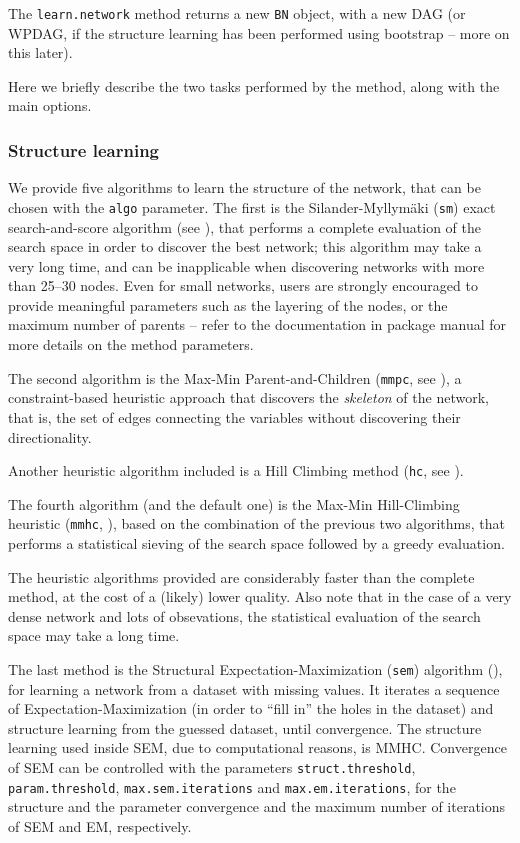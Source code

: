 \documentclass{article}\usepackage[]{graphicx}\usepackage[]{color}
\newcommand{\Robject}[1]{{\texttt{#1}}}
\newcommand{\Rmethod}[1]{{\texttt{#1}}}
\newcommand{\Rfunarg}[1]{{\texttt{#1}}}
\begin{document}
The \Rmethod{learn.network} method returns a new \Robject{BN} object, with a new DAG (or WPDAG, if the structure
learning has been performed using bootstrap -- more on this later).

Here we briefly describe the two tasks performed by the method, along with the main options.

\subsubsection{Structure learning}
We provide five algorithms to learn the structure of the network, that can be chosen with the \texttt{algo} parameter.
The first is the Silander-Myllym\"aki (\texttt{sm})
exact search-and-score algorithm (see \citet*{silander2012simple}), that performs a complete evaluation of the search space in order to discover
the best network; this algorithm may take a very long time, and can be inapplicable when discovering networks
with more than 25--30 nodes. Even for small networks, users are strongly encouraged to provide
meaningful parameters such as the layering of the nodes, or the maximum number of parents -- refer to the 
documentation in package manual for more details on the method parameters.

The second algorithm is the Max-Min Parent-and-Children (\texttt{mmpc}, see \citet*{tsamardinos2006max}), a
constraint-based heuristic approach that discovers the \emph{skeleton} of the network, that is, the set of edges
connecting the variables without discovering their directionality.

Another heuristic algorithm included is a Hill Climbing method (\texttt{hc}, see \citet*{tsamardinos2006max}).

The fourth algorithm (and the default one) is the Max-Min Hill-Climbing heuristic (\texttt{mmhc}, \citet*{tsamardinos2006max}),
based on the combination of the previous two algorithms, that performs a statistical
sieving of the search space followed by a greedy evaluation. 

The heuristic algorithms provided are considerably faster than the complete method, at the cost of a (likely)
lower quality. Also note that in the case of a very dense network and lots of obsevations, the statistical evaluation
of the search space may take a long time.%

The last method is the Structural Expectation-Maximization (\texttt{sem}) algorithm (\citet{friedman1997learning,friedman1998bayesian}),
for learning a network from a dataset with missing values. It iterates a sequence of Expectation-Maximization (in order to ``fill in''
the holes in the dataset) and structure learning from the guessed dataset, until convergence. The structure learning used inside SEM,
due to computational reasons, is MMHC. Convergence of SEM can be controlled with the parameters \Rfunarg{struct.threshold},
\Rfunarg{param.threshold}, \Rfunarg{max.sem.iterations} and \Rfunarg{max.em.iterations},
for the structure and the parameter convergence and the maximum number of iterations of SEM and EM, respectively.
\end{document}
